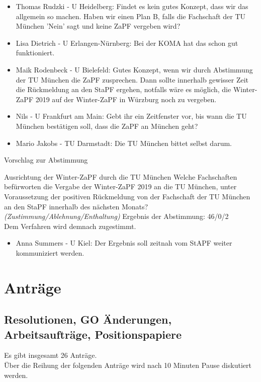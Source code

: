     \begin{itemize}
      \item Thomas Rudzki - U Heidelberg: Findet es kein gutes Konzept, dass wir das allgemein so machen. Haben wir einen Plan B, falls die Fachschaft der TU München 'Nein' sagt und keine ZaPF vergeben wird?
      \item Lisa Dietrich - U Erlangen-Nürnberg: Bei der KOMA hat das schon gut funktioniert.
      \item Maik Rodenbeck - U Bielefeld: Gutes Konzept, wenn wir durch Abstimmung der TU München die ZaPF zusprechen. Dann sollte innerhalb gewisser Zeit die Rückmeldung an den StaPF ergehen, notfalls wäre es möglich, die Winter-ZaPF 2019 auf der Winter-ZaPF in Würzburg noch zu vergeben.
      \item  Nils - U Frankfurt am Main: Gebt ihr ein Zeitfenster vor, bis wann die TU München bestätigen soll, dass die ZaPF an München geht?
      \item Mario Jakobs - TU Darmstadt: Die TU München bittet selbst darum.
    \end{itemize}
    Vorschlag zur Abstimmung

    \begin{success}{Ausrichtung der Winter-ZaPF durch die TU München}
      Welche Fachschaften befürworten die Vergabe der Winter-ZaPF 2019 an die TU München, unter Voraussetzung der positiven Rückmeldung von der Fachschaft der TU München an den StaPF innerhalb des nächsten Monats? \textit{(Zustimmung/Ablehnung/Enthaltung)}
      \tcblower
      Ergebnis der Abstimmung: 46/0/2 \\
      Dem Verfahren wird demnach zugestimmt.
    \end{success}

    \begin{itemize}
      \item Anna Summers - U Kiel: Der Ergebnis soll zeitnah vom StAPF weiter kommuniziert werden.
    \end{itemize}

\section{Anträge}
 \tocless\subsection{Resolutionen, GO Änderungen, Arbeitsaufträge, Positionspapiere}
    Es gibt insgesamt 26 Anträge. \\
    Über die Reihung der folgenden Anträge wird nach 10 Minuten Pause diskutiert werden.

